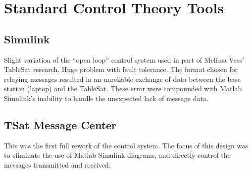 
\chapter{Standard Control Theory Tools}
\label{chap:StandardTools}

\section{Simulink}
\label{sec:Simulink}

Slight variation of the ``open loop'' control system used in part of Melissa Vess' TableSat research.  Huge problem with fault tolerance.  The format chosen for relaying messages resulted in an unreliable exchange of data between the base station (laptop) and the TableSat.  These error were compounded with Matlab Simulink's inability to handle the unexpected lack of message data.



\section{TSat Message Center}
\label{sec:TSatMessageCenter}

This was the first full rework of the control system.  The focus of this design was to eliminate the use of Matlab Simulink diagrams, and directly control the messages transmitted and received.

